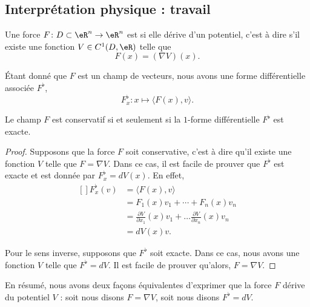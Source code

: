 \subsection{Interprétation physique : travail}

\begin{definition}
	Une force $F\colon D\subset\eR^n\to \eR^n$ est  si elle dérive d'un potentiel, c'est à dire s'il existe une fonction $V\in C^1(D,\eR)$ telle que
	\begin{equation}
		F(x)=(\nabla V)(x).
	\end{equation}
\end{definition}
Étant donné que $F$ est un champ de vecteurs, nous avons une forme différentielle associée $F^{\flat}$,
\begin{equation}
	F^{\flat}_x\colon x\mapsto \langle F(x), v\rangle .
\end{equation}

\begin{lemma}
	Le champ $F$ est conservatif si et seulement si la $1$-forme différentielle $F^{\flat}$ est exacte.
\end{lemma}

\begin{proof}
	Supposons que la force $F$ soit conservative, c'est à dire qu'il existe une fonction $V$ telle que $F=\nabla V$. Dans ce cas, il est facile de prouver que $F^{\flat}$ est exacte et est donnée par $F_x^{\flat}=dV(x)$. En effet,
	\begin{equation}
		\begin{aligned}[]
			F_x^{\flat}(v)	&=\langle F(x), v\rangle \\
					&=F_1(x)v_1+\cdots+F_n(x)v_n\\
					&=\frac{ \partial V }{ \partial x_1 }(x)v_1+\ldots\frac{ \partial V }{ \partial x_n }(x)v_n\\
					&=dV(x)v.
		\end{aligned}
	\end{equation}

	Pour le sens inverse, supposons que $F^{\flat}$ soit exacte. Dans ce cas, nous avons une fonction $V$ telle que $F^{\flat}=dV$. Il est facile de prouver qu'alors, $F=\nabla V$.
\end{proof}
En résumé, nous avons deux façons équivalentes d'exprimer que la force $F$ dérive du potentiel $V$ :  soit nous disons $F=\nabla V$, soit nous disons $F^{\flat}=dV$.

